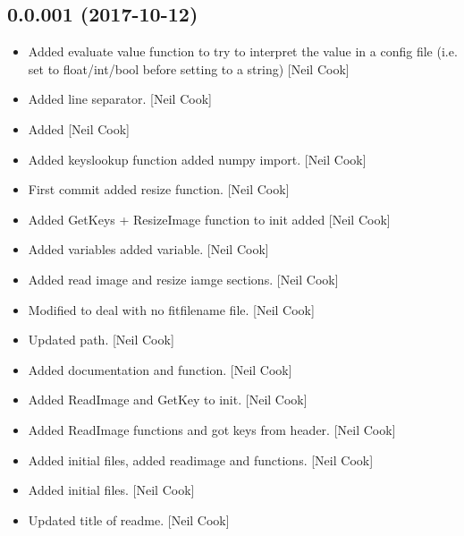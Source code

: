 \documentclass[a4paper,10pt,english]{report}
\begin{document}
\subsection{0.0.001 (2017-10-12)}
\label{\detokenize{misc/changelog:id549}}\begin{itemize}
\item {} 
Added evaluate value function to try to interpret the value in a
config file (i.e. set to float/int/bool before setting to a string)
{[}Neil Cook{]}

\item {} 
Added line separator. {[}Neil Cook{]}

\item {} 
Added  {[}Neil Cook{]}

\item {} 
Added keyslookup function added numpy import. {[}Neil Cook{]}

\item {} 
First commit added resize function. {[}Neil Cook{]}

\item {} 
Added GetKeys + ResizeImage function to init added  {[}Neil
Cook{]}

\item {} 
Added  variables added 
variable. {[}Neil Cook{]}

\item {} 
Added read image and resize iamge sections. {[}Neil Cook{]}

\item {} 
Modified  to deal with no fitfilename file. {[}Neil Cook{]}

\item {} 
Updated  path. {[}Neil Cook{]}

\item {} 
Added  documentation and
 function. {[}Neil Cook{]}

\item {} 
Added ReadImage and GetKey to init. {[}Neil Cook{]}

\item {} 
Added ReadImage functions and got keys from header. {[}Neil Cook{]}

\item {} 
Added initial files, added readimage and  functions.
{[}Neil Cook{]}

\item {} 
Added initial files. {[}Neil Cook{]}

\item {} 
Updated title of readme. {[}Neil Cook{]}

\end{itemize}



\renewcommand{\indexname}{Index}
\printindex
\end{document}
